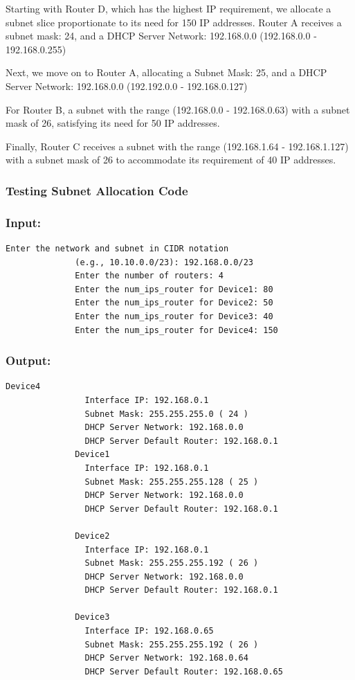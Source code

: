 Starting with Router D, which has the highest IP requirement, we allocate a subnet slice proportionate to its need for 150 IP addresses. Router A receives a subnet mask: 24, and a DHCP Server Network: 192.168.0.0  (192.168.0.0 - 192.168.0.255)

Next, we move on to Router A, allocating a Subnet Mask: 25, and a DHCP Server Network: 192.168.0.0  (192.192.0.0 - 192.168.0.127)

For Router B, a subnet with the range (192.168.0.0 - 192.168.0.63) with a subnet mask of 26, satisfying its need for 50 IP addresses.

Finally, Router C receives a subnet with the range (192.168.1.64 - 192.168.1.127) with a subnet mask of 26 to accommodate its requirement of 40 IP addresses.

\subsubsection{Testing Subnet Allocation Code}
\subsubsection{Input:}

\begin{lstlisting}[style=pythonStyle, caption={Routers informations input.}, backgroundcolor=\color{codebackground}]
              Enter the network and subnet in CIDR notation 
              (e.g., 10.10.0.0/23): 192.168.0.0/23
              Enter the number of routers: 4
              Enter the num_ips_router for Device1: 80
              Enter the num_ips_router for Device2: 50
              Enter the num_ips_router for Device3: 40
              Enter the num_ips_router for Device4: 150
\end{lstlisting}
\subsubsection{Output:}

\begin{lstlisting}[style=pythonStyle, caption={Output.}, backgroundcolor=\color{codebackground}]
              Device4
                Interface IP: 192.168.0.1
                Subnet Mask: 255.255.255.0 ( 24 )       
                DHCP Server Network: 192.168.0.0        
                DHCP Server Default Router: 192.168.0.1
              Device1
                Interface IP: 192.168.0.1
                Subnet Mask: 255.255.255.128 ( 25 )     
                DHCP Server Network: 192.168.0.0        
                DHCP Server Default Router: 192.168.0.1 

              Device2
                Interface IP: 192.168.0.1
                Subnet Mask: 255.255.255.192 ( 26 )     
                DHCP Server Network: 192.168.0.0        
                DHCP Server Default Router: 192.168.0.1 

              Device3
                Interface IP: 192.168.0.65
                Subnet Mask: 255.255.255.192 ( 26 )     
                DHCP Server Network: 192.168.0.64       
                DHCP Server Default Router: 192.168.0.65

\end{lstlisting}